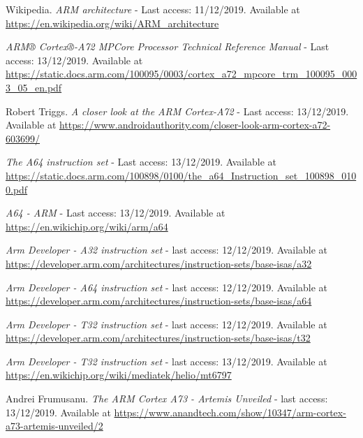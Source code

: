 \documentclass[12pt]{article}
\begin{document}
\newpage
\begin{thebibliography}{9}
Wikipedia.
\textit{ARM architecture} - Last access: 11/12/2019. Available at \url{https://en.wikipedia.org/wiki/ARM_architecture} 

\textit{ARM® Cortex®-A72 MPCore Processor Technical Reference Manual} - Last access: 13/12/2019. Available at \url{https://static.docs.arm.com/100095/0003/cortex_a72_mpcore_trm_100095_0003_05_en.pdf}
 
Robert Triggs. \textit{A closer look at the ARM Cortex-A72} - Last access: 13/12/2019. Available at \url{https://www.androidauthority.com/closer-look-arm-cortex-a72-603699/}

\textit{The A64 instruction set} - Last access: 13/12/2019. Available at \url{https://static.docs.arm.com/100898/0100/the_a64_Instruction_set_100898_0100.pdf}

\textit{A64 - ARM} - Last access: 13/12/2019. Available at \url{https://en.wikichip.org/wiki/arm/a64}

\textit{Arm Developer - A32 instruction set} - last access: 12/12/2019. Available at \url{https://developer.arm.com/architectures/instruction-sets/base-isas/a32}

\textit{Arm Developer - A64 instruction set} - last access: 12/12/2019. Available at \url{https://developer.arm.com/architectures/instruction-sets/base-isas/a64}

\textit{Arm Developer - T32 instruction set} - last access: 12/12/2019. Available at \url{https://developer.arm.com/architectures/instruction-sets/base-isas/t32}


\textit{Arm Developer - T32 instruction set} - last access: 13/12/2019. Available at \url{https://en.wikichip.org/wiki/mediatek/helio/mt6797}

Andrei Frumusanu. \textit{The ARM Cortex A73 - Artemis Unveiled} - last access: 13/12/2019. Available at \url{https://www.anandtech.com/show/10347/arm-cortex-a73-artemis-unveiled/2}

\end{thebibliography}
\end{document}

